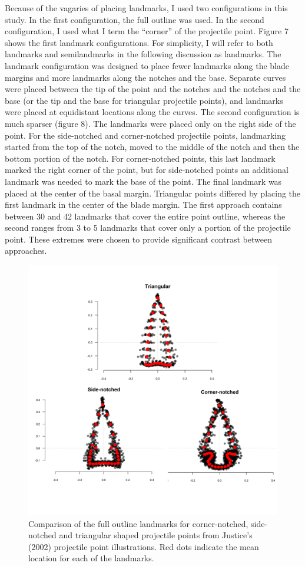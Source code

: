 \documentclass[a4paper]{article}
\begin{document}
Because of the vagaries of placing landmarks, I used two configurations in this study. In the first configuration, the full outline was used. In the second configuration, I used what I term the ``corner'' of the projectile point. Figure 7 shows the first landmark configurations. For simplicity, I will refer to both landmarks and semilandmarks in the following discussion as landmarks. The landmark configuration was designed to place fewer landmarks along the blade margins and more landmarks along the notches and the base. Separate curves were placed between the tip of the point and the notches and the notches and the base (or the tip and the base for triangular projectile points), and landmarks were placed at equidistant locations along the curves. The second configuration is much sparser (figure 8). The landmarks were placed only on the right side of the point. For the side-notched and corner-notched projectile points, landmarking started from the top of the notch, moved to the middle of the notch and then the bottom portion of the notch. For corner-notched points, this last landmark marked the right corner of the point, but for side-notched points an additional landmark was needed to mark the base of the point. The final landmark was placed at the center of the basal margin. Triangular points differed by placing the first landmark in the center of the blade margin. The first approach contains between 30 and 42 landmarks that cover the entire point outline, whereas the second ranges from 3 to 5 landmarks that cover only a portion of the projectile point. These extremes were chosen to provide significant contrast between approaches.

\begin{figure}
\includegraphics[width=1\linewidth]{figures/curveComparison} \caption{Comparison of the full outline landmarks for corner-notched, side-notched and triangular shaped projectile points from Justice's (2002) projectile point illustrations. Red dots indicate the mean location for each of the landmarks.}\label{fig:curvesStack}
\end{figure}
\end{document}
